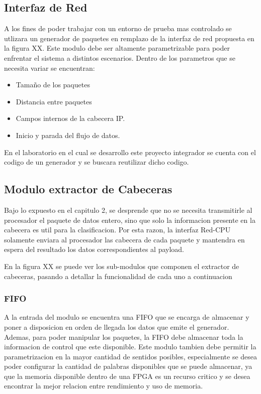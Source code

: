 \subsection{Interfaz de Red}
A los fines de poder trabajar con un entorno de prueba mas controlado se utlizara un generador de paquetes en remplazo de la interfaz de red propuesta en la figura XX. 
Este modulo debe ser altamente parametrizable para poder enfrentar el sistema a distintos escenarios. Dentro de los parametros que se necesita variar se encuentran:

\begin{itemize}
	\item Tamaño de los paquetes 
	\item Distancia entre paquetes
	\item Campos internos de la cabecera IP. 
	\item Inicio y parada del flujo de datos. 
\end{itemize}

En el laboratorio en el cual se desarrollo este proyecto integrador se cuenta con el codigo de un generador y se buscara reutilizar dicho codigo.

\subsection{Modulo extractor de Cabeceras}
Bajo lo expuesto en el capitulo 2, se desprende que no se necesita transmitirle al procesador el paquete de datos entero, sino que solo la informacion presente en la cabecera es util para la clasificacion. Por esta razon, la interfaz Red-CPU solamente enviara al procesador las cabecera de cada paquete y mantendra en espera del resultado los datos correspondientes al payload. 

En la figura XX se puede ver los sub-modulos que componen el extractor de cabeceras, pasando a detallar la funcionalidad de cada uno a continuacion

\subsubsection{FIFO}
A la entrada del modulo se encuentra una FIFO que se encarga de almacenar y poner a disposicion en orden de llegada los datos que emite el generador. Ademas, para poder manipular los paquetes, la FIFO debe almacenar toda la informacion de control que este disponible. 
Este modulo tambien debe permitir la parametrizacion en la mayor cantidad de sentidos posibles, especialmente se desea poder configurar la cantidad de palabras disponibles que se puede almacenar, ya que la memoria disponible dentro de una FPGA es un recurso critico y se desea encontrar la mejor relacion entre rendimiento y uso de memoria.


